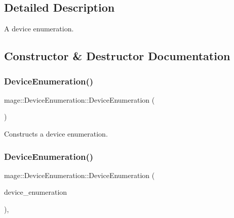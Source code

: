\subsection{Detailed Description}
A device enumeration. 

\subsection{Constructor \& Destructor Documentation}
\hypertarget{classmage_1_1_device_enumeration_aa000048648beb6c2aca70e5ef04e0da2}{}\label{classmage_1_1_device_enumeration_aa000048648beb6c2aca70e5ef04e0da2} 
\subsubsection{\texorpdfstring{Device\+Enumeration()}{DeviceEnumeration()}\hspace{0.1cm}{\footnotesize\ttfamily [1/3]}}
{\footnotesize\ttfamily mage\+::\+Device\+Enumeration\+::\+Device\+Enumeration (\begin{DoxyParamCaption}{ }\end{DoxyParamCaption})\hspace{0.3cm}{\ttfamily [private]}}

Constructs a device enumeration. \hypertarget{classmage_1_1_device_enumeration_a90f3dc13cfb413aa8a2a49a31bcb6ae3}{}\label{classmage_1_1_device_enumeration_a90f3dc13cfb413aa8a2a49a31bcb6ae3} 
\subsubsection{\texorpdfstring{Device\+Enumeration()}{DeviceEnumeration()}\hspace{0.1cm}{\footnotesize\ttfamily [2/3]}}
{\footnotesize\ttfamily mage\+::\+Device\+Enumeration\+::\+Device\+Enumeration (\begin{DoxyParamCaption}\item[{const \hyperlink{classmage_1_1_device_enumeration}{Device\+Enumeration} \&}]{device\+\_\+enumeration }\end{DoxyParamCaption})\hspace{0.3cm}{\ttfamily [private]}, {\ttfamily [delete]}}

